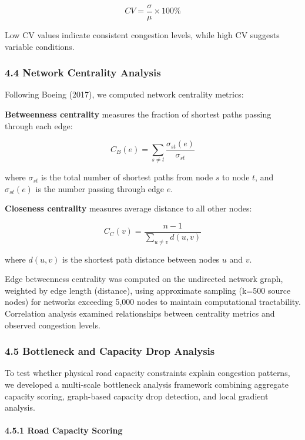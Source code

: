 \[CV = \frac{\sigma}{\mu} \times 100\%\]

Low CV values indicate consistent congestion levels, while high CV suggests variable conditions.

\subsubsection{4.4 Network Centrality Analysis}\label{network-centrality-analysis}

Following Boeing (2017), we computed network centrality metrics:

\textbf{Betweenness centrality} measures the fraction of shortest paths passing through each edge:

\[C_B(e) = \sum_{s \neq t} \frac{\sigma_{st}(e)}{\sigma_{st}}\]

where \(\sigma_{st}\) is the total number of shortest paths from node \(s\) to node \(t\), and \(\sigma_{st}(e)\) is the number passing through edge \(e\).

\textbf{Closeness centrality} measures average distance to all other nodes:

\[C_C(v) = \frac{n-1}{\sum_{u \neq v} d(u,v)}\]

where \(d(u,v)\) is the shortest path distance between nodes \(u\) and \(v\).

Edge betweenness centrality was computed on the undirected network graph, weighted by edge length (distance), using approximate sampling (k=500 source nodes) for networks exceeding 5,000 nodes to maintain computational tractability. Correlation analysis examined relationships between centrality metrics and observed congestion levels.

\subsubsection{4.5 Bottleneck and Capacity Drop Analysis}\label{bottleneck-and-capacity-drop-analysis}

To test whether physical road capacity constraints explain congestion patterns, we developed a multi-scale bottleneck analysis framework combining aggregate capacity scoring, graph-based capacity drop detection, and local gradient analysis.

\paragraph{4.5.1 Road Capacity Scoring}\label{road-capacity-scoring}


